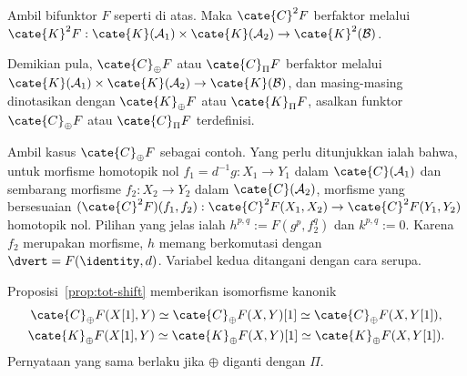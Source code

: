 \begin{proposisi}\label{prop:bifunctor-cplx-homotopy}
	Ambil bifunktor $F$ seperti di atas. Maka $\cate{C}^2F$ berfaktor melalui
	$\cate{K}^2F:\cate{K}(\mathcal{A}_1)\times\cate{K}(\mathcal{A}_2)\to
	\cate{K}^2(\mathcal{B})$.
	
	Demikian pula, $\cate{C}_{\oplus}F$ atau $\cate{C}_{\Pi}F$ berfaktor
	melalui $\cate{K}(\mathcal{A}_1)\times\cate{K}(\mathcal{A}_2)\to
	\cate{K}(\mathcal{B})$, dan masing-masing dinotasikan dengan
	$\cate{K}_{\oplus}F$ atau $\cate{K}_{\Pi}F$, asalkan funktor
	$\cate{C}_{\oplus}F$ atau $\cate{C}_{\Pi}F$ terdefinisi.
\end{proposisi}
\begin{bukti}
	Ambil kasus $\cate{C}_{\oplus}F$ sebagai contoh. Yang perlu ditunjukkan
	ialah bahwa, untuk morfisme homotopik nol
	$f_1=d^{-1}g:X_1\to Y_1$ dalam $\cate{C}(\mathcal{A}_1)$ dan sembarang
	morfisme $f_2:X_2\to Y_2$ dalam $\cate{C}(\mathcal{A}_2)$, morfisme yang
	bersesuaian $(\cate{C}^2F)(f_1,f_2):\cate{C}^2F(X_1,X_2)\to
	\cate{C}^2F(Y_1,Y_2)$ homotopik nol. Pilihan yang jelas ialah
	$h^{p,q}:=F(g^p,f_2^q)$ dan $k^{p,q}:=0$. Karena $f_2$ merupakan morfisme,
	$h$ memang berkomutasi dengan $\dvert=F(\identity,d)$. Variabel kedua
	ditangani dengan cara serupa.
\end{bukti}

Proposisi~\ref{prop:tot-shift} memberikan isomorfisme kanonik
\begin{gather*}
	\cate{C}_{\oplus} F(X[1], Y) \simeq \cate{C}_{\oplus}F(X, Y)[1] \simeq \cate{C}_{\oplus}F(X, Y[1]), \\
	\cate{K}_{\oplus} F(X[1], Y) \simeq \cate{K}_{\oplus}F(X, Y)[1] \simeq \cate{K}_{\oplus}F(X, Y[1]).
\end{gather*}
Pernyataan yang sama berlaku jika $\oplus$ diganti dengan $\Pi$.

